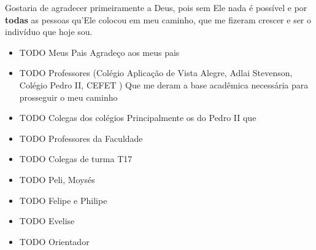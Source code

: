 Gostaria de agradecer primeiramente a Deus, pois sem Ele nada é
possível e por \textbf{todas} as pessoas qu'Ele colocou em meu
caminho, que me fizeram crescer e ser o indivíduo que hoje sou.

\begin{itemize}
\item TODO Meus Pais
Agradeço aos meus pais
\item TODO Professores (Colégio Aplicação de Vista Alegre, Adlai Stevenson, Colégio Pedro II, CEFET )
Que me deram a base acadêmica necessária para prosseguir o meu caminho
\item TODO Colegas dos colégios
Principalmente os do Pedro II que
\item TODO Professores da Faculdade

\item TODO Colegas de turma T17

\item TODO Peli, Moysés

\item TODO Felipe e Philipe

\item TODO Evelise

\item TODO Orientador
\end{itemize}

